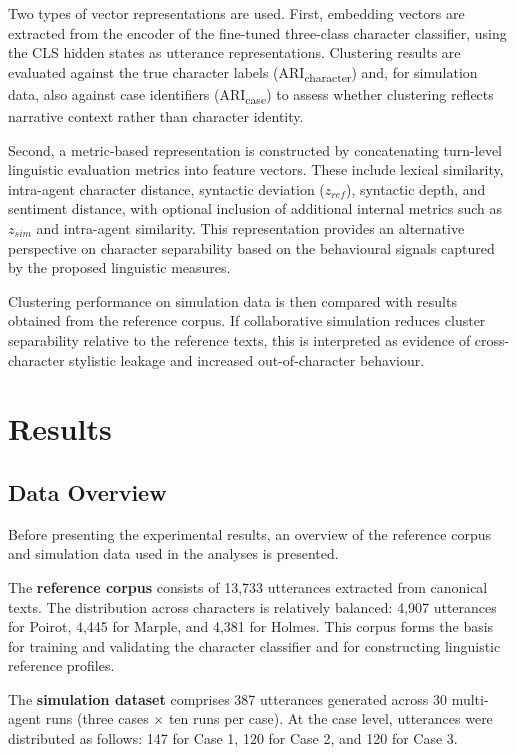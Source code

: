 \documentclass{article}
\begin{document}
Two types of vector representations are used. First, embedding vectors are extracted from the encoder of the fine-tuned three-class character classifier, using the CLS hidden states as utterance representations. Clustering results are evaluated against the true character labels (ARI\textsubscript{character}) and, for simulation data, also against case identifiers (ARI\textsubscript{case}) to assess whether clustering reflects narrative context rather than character identity.

Second, a metric-based representation is constructed by concatenating turn-level linguistic evaluation metrics into feature vectors. These include lexical similarity, intra-agent character distance, syntactic deviation ($z_{ref}$), syntactic depth, and sentiment distance, with optional inclusion of additional internal metrics such as $z_{sim}$ and intra-agent similarity. This representation provides an alternative perspective on character separability based on the behavioural signals captured by the proposed linguistic measures.

Clustering performance on simulation data is then compared with results obtained from the reference corpus. If collaborative simulation reduces cluster separability relative to the reference texts, this is interpreted as evidence of cross-character stylistic leakage and increased out-of-character behaviour.

\section{Results}

\subsection{Data Overview}

Before presenting the experimental results, an overview of the reference corpus and simulation data used in the analyses is presented.

The \textbf{reference corpus} consists of 13,733 utterances extracted from canonical texts. The distribution across characters is relatively balanced: 4,907 utterances for Poirot, 4,445 for Marple, and 4,381 for Holmes. This corpus forms the basis for training and validating the character classifier and for constructing linguistic reference profiles.

The \textbf{simulation dataset} comprises 387 utterances generated across 30 multi-agent runs (three cases × ten runs per case). At the case level, utterances were distributed as follows: 147 for Case 1, 120 for Case 2, and 120 for Case 3.
\end{document}
